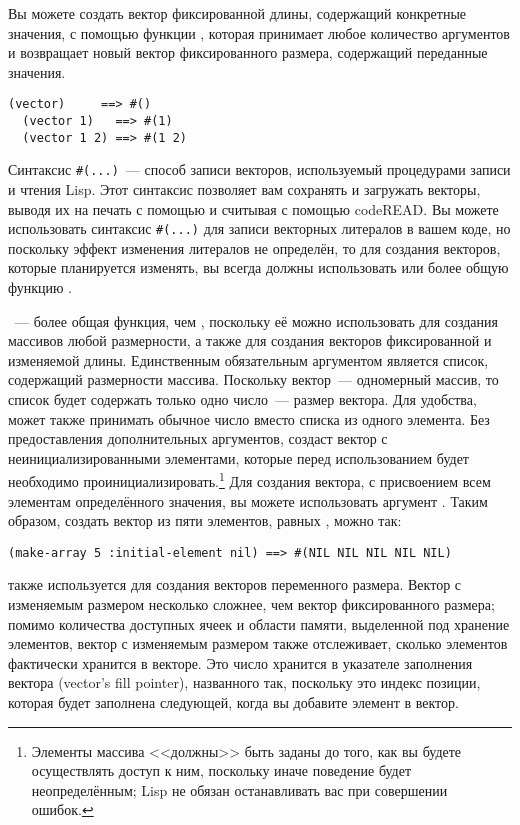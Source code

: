 Вы можете создать вектор фиксированной длины, содержащий конкретные значения, с помощью
функции , которая принимает любое количество аргументов и возвращает
новый вектор фиксированного размера, содержащий переданные значения.

\begin{lstlisting}[style=lisprepl]
  (vector)     ==> #()
  (vector 1)   ==> #(1)
  (vector 1 2) ==> #(1 2)
\end{lstlisting}

Синтаксис \lstinline!#(...)!~--- способ записи векторов, используемый процедурами
записи и чтения Lisp.  Этот синтаксис позволяет вам сохранять и загружать векторы,
выводя их на печать с помощью  и считывая с помощью code{READ}.
Вы можете использовать синтаксис \lstinline!#(...)! для
записи векторных литералов в вашем коде, но поскольку эффект изменения литералов не определён,
то для создания векторов, которые планируется изменять, вы всегда должны 
использовать  или более общую функцию .

~--- более общая функция, чем , поскольку её можно
использовать для создания массивов любой размерности, а также для создания векторов
фиксированной и изменяемой длины. Единственным обязательным аргументом 
является список, содержащий размерности массива.  Поскольку вектор~--- одномерный массив,
то список будет содержать только одно число~--- размер вектора.  Для удобства,
 может также принимать обычное число вместо списка из одного элемента.
Без предоставления дополнительных аргументов,  создаст вектор с
неинициализированными элементами, которые перед использованием будет необходимо
проинициализировать.\footnote{Элементы массива <<должны>> быть заданы до того, как вы будете осуществлять
  доступ к ним, поскольку иначе поведение будет неопределённым; Lisp не обязан
  останавливать вас при совершении ошибок.}  Для создания вектора, с присвоением всем
элементам определённого значения, вы можете использовать аргумент .
Таким образом, создать вектор из пяти элементов, равных , можно так:

\begin{lstlisting}[style=lisprepl]
  (make-array 5 :initial-element nil) ==> #(NIL NIL NIL NIL NIL)
\end{lstlisting}

 также используется для создания векторов переменного размера.
Вектор с изменяемым размером несколько сложнее, чем вектор фиксированного размера;
помимо количества доступных ячеек и области памяти, выделенной под хранение элементов,
вектор с изменяемым размером также отслеживает, сколько элементов фактически
хранится в векторе.  Это число хранится в указателе заполнения вектора (vector's fill
pointer), названного так, поскольку это индекс позиции, которая будет заполнена следующей,
когда вы добавите элемент в вектор.

